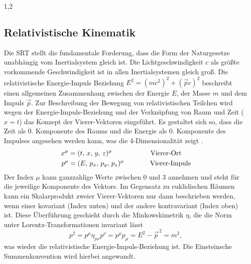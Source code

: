 \documentclass[11pt,a4paper,twoside]{report}
\begin{document}
\begin{spacing}{1,2}
\subsection{Relativistische Kinematik}
Die SRT stellt die fundamentale Forderung, dass die Form der Naturgesetze unabhängig vom Inertialsystem gleich ist. Die Lichtgeschwindigkeit $c$ als
größte vorkommende Geschwindigkeit ist in allen Inertialsystemen gleich groß. Die relativistische Energie-Impuls Beziehung 
$E^2 = \left(mc^2\right)^2 + \left(\vec pc\right)^2$ beschreibt einen allgemeinen Zusammenhang zwischen der Energie $E$, der Masse $m$ und dem Impuls $\vec p$.
% 
\noindent
Zur Beschreibung der Bewegung von relativistischen Teilchen wird wegen der Energie-Impuls-Beziehung und der Verknüpfung von Raum und Zeit ($x = t$) das Konzept
der Vierer-Vektoren eingeführt. Es gestaltet sich so, dass die Zeit als 0. Komponente des Raums und die Energie als 0. Komponente des Impulses angesehen werden
kann, was die 4-Dimensionalität zeigt \cite{RelKin}.
\begin{align}
 x^\mu &= (t,\,x,\,y,\,z)^\mu \hspace{2cm} \text{Vierer-Ort}\\
 p^\mu &= (E,\,p_x,\,p_y,\,p_z)^\mu \hspace{1.35cm} \text{Vierer-Impuls}
\end{align}
Der Index $\mu$ kann ganzzahlige Werte zwischen 0 und 3 annehmen und steht für die jeweilige Komponente des Vektors. Im Gegensatz zu euklidischen Räumen 
kann ein Skalarprodukt zweier Vierer-Vektoren nur dann beschrieben werden, wenn einer kovariant (Index unten) und der andere kontravariant (Index oben) ist.
Diese Überführung geschieht durch die Minkowskimetrik $\eta$, die die Norm unter Lorentz-Transformationen invariant lässt
\begin{equation}
  p^2 = p^\mu \eta_{\mu \nu} p^\nu = p^\mu p_\mu = E^2 - \vec{p}^{\,2} = m^2,
\end{equation}
was wieder die relativistische Energie-Impuls-Beziehung ist. Die Einsteinsche Summenkonvention wird hierbei angewandt.

\end{spacing}
\end{document}

